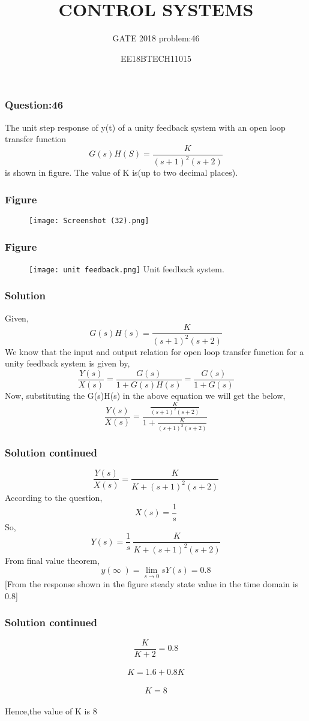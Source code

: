 \documentclass{beamer}
\title{CONTROL SYSTEMS
}
\author{GATE 2018 problem:46
}
\institute{\large  G Krupateja}
\date{EE18BTECH11015}
\begin{document}
\frame{\titlepage}
\begin{frame}
\frametitle{Question:46}
The unit step response of y(t) of a unity feedback system with an open loop transfer function  
\[ G(s)H(S)=\frac{K}{(s+1)^2(s+2)}  \]
is shown in figure. The value of K is(up to two decimal places).
\end{frame}
\begin{frame}
\frametitle{Figure}
\begin{figure}
    \centering
    \texttt{[image: Screenshot (32).png]}
    
    
\end{figure}
\end{frame}

\begin{frame}
\frametitle{Figure}
\begin{figure}
    \centering
    \texttt{[image: unit feedback.png]}
    Unit feedback system.
    
    
    
\end{figure}
\end{frame}

\begin{frame}
\frametitle{Solution}
Given,
\[ G(s)H(s)=\frac{K}{(s+1)^2(s+2)}  \]
We know that the input and output relation for open loop transfer function for a unity feedback system is given by,
\[ \frac{Y(s)}{X(s)}=\frac{G(s)}{1+G(s)H(s)}=\frac{G(s)}{1+G(s)}\]
Now, substituting the G(s)H(s) in the above equation we will get the below,
\[ \frac{Y(s)}{X(s)}=\frac{\frac{K}{(s+1)^2(s+2)}}{1+\frac{K}{(s+1)^2(s+2)}}\]
\end{frame}
\begin{frame}
\frametitle{Solution continued}
  \[ \frac{Y(s)}{X(s)}=\frac{K}{K+(s+1)^2(s+2)}  \]
According to the question, \[X(s)=\frac{1}{s}\]
So,\[Y(s)=\frac{1}{s} \  \frac{K}{K+(s+1)^2(s+2)}\]
From final value theorem,
\[y(\infty\;)=\lim_{s \rightarrow 0 }sY(s)=0.8\]
[From the response shown in the figure steady state value in the time domain is 0.8]
\end{frame}
\begin{frame}
\frametitle{Solution continued}
\[\frac{K}{K+2}=0.8\]\\
\[K=1.6+0.8K\]\\
\[K=8\]\\
Hence,the value of K is 8
\end{frame}
\end{document}

